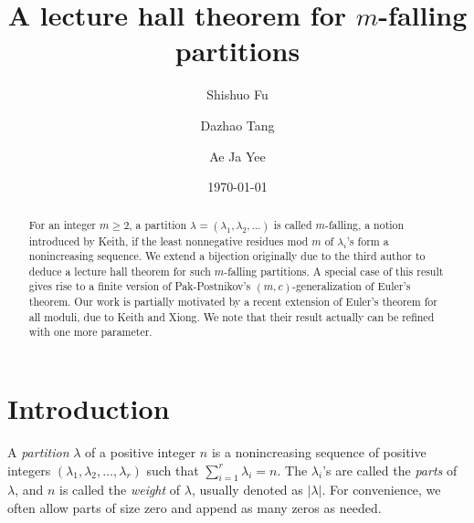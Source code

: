 \documentclass[11pt,reqno]{amsart}
\numberwithin{equation}{section}
\theoremstyle{plain}
\theoremstyle{definition}
\begin{document}
\title[$m$-falling lecture hall theorem]{A lecture hall theorem for $m$-falling partitions}

\author[S. Fu]{Shishuo Fu}
\address[Shishuo Fu]{College of Mathematics and Statistics, Chongqing University, Huxi campus LD506, Chongqing 401331, P.R. China}


\author[D. Tang]{Dazhao Tang}

\address[Dazhao Tang]{College of Mathematics and Statistics, Chongqing University, Huxi campus LD206, Chongqing 401331, P.R. China}

\author[A. J. Yee]{Ae Ja Yee}
\address[Ae Ja Yee]{Department of Mathematics, The Pennsylvania State University, University Park, PA 16802, USA}

\date{\today}


\begin{abstract}
For an integer $m\ge 2$, a partition $\lambda=(\lambda_1,\lambda_2,\ldots)$ is called $m$-falling, a notion introduced by Keith, if the least nonnegative residues mod $m$ of $\lambda_i$'s form a nonincreasing sequence. We extend a bijection originally due to the third author to deduce a lecture hall theorem for such $m$-falling partitions. A special case of this result gives rise to a finite version of Pak-Postnikov's $(m,c)$-generalization of Euler's theorem. Our work is partially motivated by a recent extension of Euler's theorem for all moduli, due to Keith and Xiong. We note that their result actually can be refined with one more parameter.
\end{abstract}



\maketitle




\section{Introduction}\label{sec1: intro}


A \emph{partition} $\lambda$ of a positive integer $n$ is a nonincreasing sequence of positive integers $(\lambda_1,\lambda_2,\ldots,\lambda_r)$ such that $\sum_{i=1}^{r}\lambda_i=n$. The $\lambda_i$'s are called the \emph{parts} of $\lambda$, and $n$ is called the \emph{weight} of $\lambda$, usually denoted as $|\lambda|$. For convenience, we often allow parts of size zero and append as many zeros as needed. 
\end{document}
